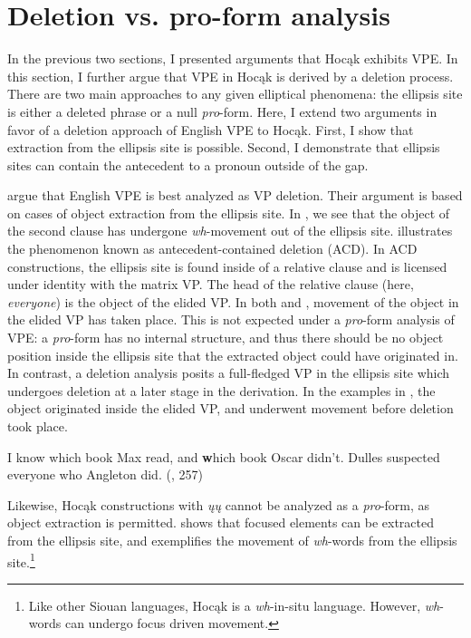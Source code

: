 \documentclass[output=paper]{LSP/langsci}
\begin{document}
\section{Deletion vs. pro-form analysis}\label{sec:johnson:4}

In the previous two sections, I presented arguments that Hocąk exhibits VPE. In this section, I further argue that VPE in Hocąk is derived by a deletion process. There are two main approaches to any given elliptical phenomena: the ellipsis site is either a deleted phrase or a null \emph{pro}-form. Here, I extend two arguments in favor of a deletion approach of English VPE to Hocąk. First, I show that extraction from the ellipsis site is possible. Second, I demonstrate that ellipsis sites can contain the antecedent to a pronoun outside of the gap.

\citet{FiengoMay1994} argue that English VPE is best analyzed as VP deletion. Their argument is based on cases of object extraction from the ellipsis site. In , we see that the object of the second clause has undergone \emph{wh}-movement out of the ellipsis site.  illustrates the phenomenon known as antecedent-contained deletion (ACD). In ACD constructions, the ellipsis site is found inside of a relative clause and is licensed under identity with the matrix VP. The head of the relative clause (here, \emph{everyone}) is the object of the elided VP. In both  and , movement of the object in the elided VP has taken place. This is not expected under a \emph{pro}-form analysis of VPE: a \emph{pro}-form has no internal structure, and thus there should be no object position inside the ellipsis site that the extracted object could have originated in. In contrast, a deletion analysis posits a full-fledged VP in the ellipsis site which undergoes deletion at a later stage in the derivation. In the examples in , the object originated inside the elided VP, and underwent movement before deletion took place.
 
\ea\label{ex:johnson:46}
\ea\label{ex:johnson:46a}
I know which book Max read, and {\textbf which book} Oscar didn't.
\ex\label{ex:johnson:46b} 
Dulles suspected everyone who Angleton did. (\citealt[229]{FiengoMay1994}, 257)
\z
\z

Likewise, Hocąk constructions with \emph{ųų} cannot be analyzed as a \emph{pro}-form, as object extraction is permitted.  shows that focused elements can be extracted from the ellipsis site, and  exemplifies the movement of \emph{wh}-words from the ellipsis site.\footnote{Like other Siouan languages, Hocąk is a \emph{wh}-in-situ language. However, \emph{wh}-words can undergo focus driven movement.}
 
\end{document}
